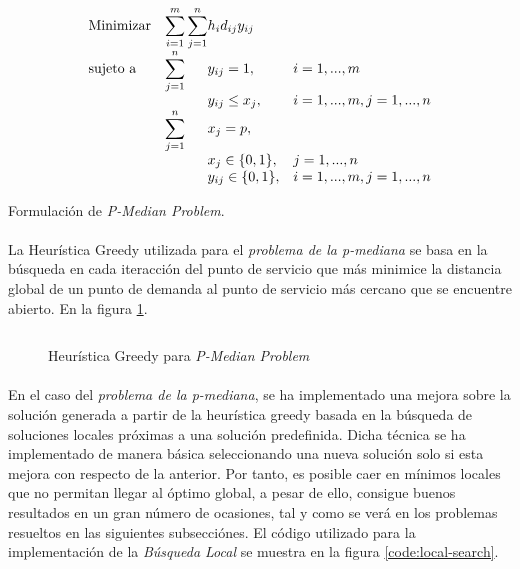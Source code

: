 \documentclass[spanish]{article}
\begin{document}
		\begin{eqfloat}
			\begin{equation}
				\begin{array}{ll@{}ll}
					\text{Minimizar}
						& \displaystyle\sum\limits_{i = 1}^m
							\displaystyle\sum\limits_{j = 1}^n	& h_i d_{ij} y_{ij}	&							\\
					\text{sujeto a}
						& \displaystyle\sum\limits_{j = 1}^n 	& y_{ij} = 1,		& i = 1,..., m	\\
						& 																	 	& y_{ij} \leq x_{j},  		& i=1 ,..., m,j=1 ,..., n  \\
						& \displaystyle\sum\limits_{j = 1}^n 	& x_{j} = p,  		& 						\\
						&                                     &	x_{j} \in \{0,1\},&j=1 ,..., n 	\\
						&                                     &	y_{ij} \in \{0,1\},&i=1 ,..., m, j=1 ,..., n  \\
				\end{array}
			\end{equation}
			\caption{Formulación de \emph{P-Median Problem}.}
      \label{eq:p_median}
    \end{eqfloat}

		\paragraph{}
		La Heurística Greedy utilizada para el \emph{problema de la p-mediana} se basa en la búsqueda en cada iteracción del punto de servicio que más minimice la distancia global de un punto de demanda al punto de servicio más cercano que se encuentre abierto. En la figura \ref{code:p-median-greedy}.

		\begin{figure}[h]
			\centering
			\inputminted{basic}{./code/p-median-greedy.mos}
			\caption{Heurística Greedy para \emph{P-Median Problem}}
			\label{code:p-median-greedy}
		\end{figure}

		\paragraph{}
		En el caso del \emph{problema de la p-mediana}, se ha implementado una mejora sobre la solución generada a partir de la heurística greedy basada en la búsqueda de soluciones locales próximas a una solución predefinida. Dicha técnica se ha implementado de manera básica seleccionando una nueva solución solo si esta mejora con respecto de la anterior. Por tanto, es posible caer en mínimos locales que no permitan llegar al óptimo global, a pesar de ello, consigue buenos resultados en un gran número de ocasiones, tal y como se verá en los problemas resueltos en las siguientes subsecciónes. El código utilizado para la implementación de la \emph{Búsqueda Local} se muestra en la figura \ref{code:local-search}.
\end{document}
